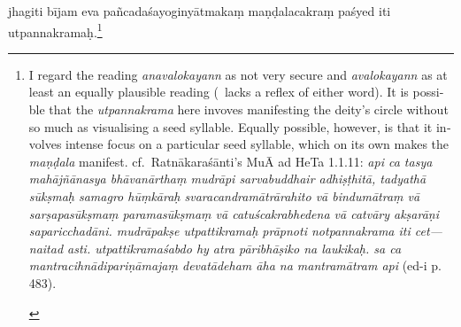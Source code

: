 \documentclass[naipra.tex]{subfiles}
\begin{document}
\begin{sanskrit}
\pstart
jhagiti bījam  eva pañcadaśayoginyātmakaṃ maṇḍalacakraṃ paśyed iti utpannakramaḥ.\footnote{
	\begin{english}%
		I regard the reading \emph{anavalokayann} as not very secure and \emph{avalokayann} as at least an equally plausible reading (\TIB\ lacks a reflex of either word).
		It is possible that the \emph{utpannakrama} here invoves manifesting the deity's circle without so much as visualising a seed syllable.
		Equally possible, however, is that it involves intense focus on a particular seed syllable, which on its own makes the \emph{maṇḍala} manifest.
		cf.\ Ratnākaraśānti's MuĀ ad HeTa 1.1.11: \emph{api ca tasya mahājñānasya bhāvanārthaṃ mudrāpi sarvabuddhair adhiṣṭhitā, tadyathā sūkṣmaḥ samagro hūṃkāraḥ svaracandramātrārahito vā bindumātraṃ vā sarṣapasūkṣmaṃ paramasūkṣmaṃ vā catuścakrabhedena vā catvāry akṣarāṇi saparicchadāni. mudrāpakṣe utpattikramaḥ prāpnoti notpannakrama iti cet—naitad asti. utpattikramaśabdo hy atra pāribhāṣiko na laukikaḥ. sa ca mantracihnādipariṇāmajaṃ devatādeham āha na mantramātram api} (ed-i p. 483).
	\end{english}
}
\pend



\end{sanskrit}
\end{document}
